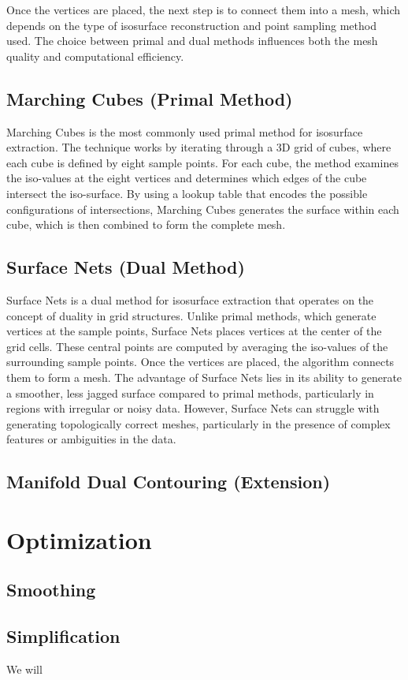 Once the vertices are placed, the next step is to connect them into a mesh, which depends on the type of isosurface reconstruction and point sampling method used. The choice between primal and dual methods influences both the mesh quality and computational efficiency.

\subsection{Marching Cubes (Primal Method)}

Marching Cubes is the most commonly used primal method for isosurface extraction. The technique works by iterating through a 3D grid of cubes, where each cube is defined by eight sample points. For each cube, the method examines the iso-values at the eight vertices and determines which edges of the cube intersect the iso-surface. By using a lookup table that encodes the possible configurations of intersections, Marching Cubes generates the surface within each cube, which is then combined to form the complete mesh.

\subsection{Surface Nets (Dual Method)}

Surface Nets is a dual method for isosurface extraction that operates on the concept of duality in grid structures. Unlike primal methods, which generate vertices at the sample points, Surface Nets places vertices at the center of the grid cells. These central points are computed by averaging the iso-values of the surrounding sample points. Once the vertices are placed, the algorithm connects them to form a mesh. The advantage of Surface Nets lies in its ability to generate a smoother, less jagged surface compared to primal methods, particularly in regions with irregular or noisy data. However, Surface Nets can struggle with generating topologically correct meshes, particularly in the presence of complex features or ambiguities in the data.

\subsection{Manifold Dual Contouring (Extension)}

\section{Optimization}


\subsection{Smoothing}



\subsection{Simplification}

We will